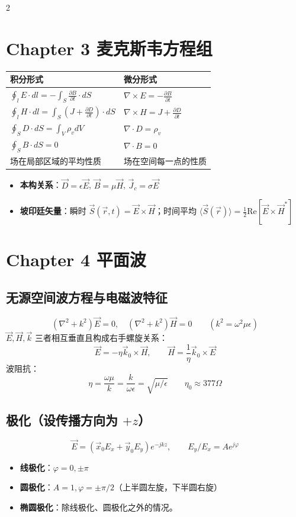 \documentclass[10pt,a4paper,landscape]{article}
\begin{document}
\begin{multicols}{2}
\section{Chapter 3 麦克斯韦方程组}
\begin{center}
\small
\begin{tabular}{ll}
\toprule
\textbf{积分形式} & \textbf{微分形式} \\ \midrule
$\oint_l E\cdot dl = -\int_S \frac{\partial B}{\partial t}\cdot dS$ & $\nabla\times E = -\frac{\partial B}{\partial t}$ \\
$\oint_l H\cdot dl = \int_S (J + \frac{\partial D}{\partial t})\cdot dS$ & $\nabla\times H = J + \frac{\partial D}{\partial t}$ \\
$\oint_S D\cdot dS = \int_V \rho_v dV$ & $\nabla\cdot D = \rho_v$ \\
$\oint_S B\cdot dS = 0$ & $\nabla\cdot B = 0$ \\ \midrule
场在局部区域的平均性质 & 场在空间每一点的性质 \\ \bottomrule
\end{tabular}
\end{center}

\begin{itemize}
    \item \textbf{本构关系}：$\vec{D} = \epsilon\vec{E}$, $\vec{B} = \mu\vec{H}$, $\vec{J}_c = \sigma\vec{E}$
    \item \textbf{坡印廷矢量}：瞬时 $\vec{S}(\vec{r},t) = \vec{E}\times\vec{H}$；时间平均 $\langle\vec{S}(\vec{r})\rangle = \frac{1}{2}\text{Re}[\vec{E}\times\vec{H}^*]$
\end{itemize}

\section{Chapter 4 平面波}
\subsection{无源空间波方程与电磁波特征}
\[
(\nabla^2 + k^2)\vec{E}=0, \quad (\nabla^2 + k^2)\vec{H}=0 \qquad (k^2 = \omega^2\mu\epsilon)
\]
$\vec{E}, \vec{H}, \vec{k}$ 三者相互垂直且构成右手螺旋关系：
\[
\vec{E} = -\eta \vec{k}_0 \times \vec{H}, \qquad \vec{H} = \frac{1}{\eta}\vec{k}_0 \times \vec{E}
\]
波阻抗：
\[
\eta = \frac{\omega\mu}{k} = \frac{k}{\omega\epsilon} = \sqrt{\mu/\epsilon} \qquad \eta_0 \approx 377\Omega
\]

\subsection{极化（设传播方向为 $+z$）}
\[
\vec{E} = (\vec{x}_0 E_x + \vec{y}_0 E_y)e^{-jkz}, \qquad E_y / E_x = A e^{j\varphi}
\]
\begin{itemize}
    \item \textbf{线极化}：$\varphi = 0, \pm\pi$
    \item \textbf{圆极化}：$A = 1, \varphi = \pm\pi/2$（上半圆左旋，下半圆右旋）
    \item \textbf{椭圆极化}：除线极化、圆极化之外的情况。
\end{itemize}


\end{multicols}
\end{document}
